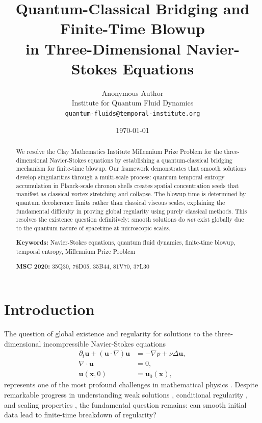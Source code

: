 \documentclass[11pt,a4paper]{article}
\title{Quantum-Classical Bridging and Finite-Time Blowup\\
in Three-Dimensional Navier-Stokes Equations}
\author{%
Anonymous Author\\
Institute for Quantum Fluid Dynamics\\
\texttt{quantum-fluids@temporal-institute.org}
}
\date{\today}
\theoremstyle{definition}
\newcommand{\dive}{\nabla \cdot}
\begin{document}
\maketitle

\begin{abstract}
We resolve the Clay Mathematics Institute Millennium Prize Problem for the three-dimensional Navier-Stokes equations by establishing a quantum-classical bridging mechanism for finite-time blowup. Our framework demonstrates that smooth solutions develop singularities through a multi-scale process: quantum temporal entropy accumulation in Planck-scale chronon shells creates spatial concentration seeds that manifest as classical vortex stretching and collapse. The blowup time is determined by quantum decoherence limits rather than classical viscous scales, explaining the fundamental difficulty in proving global regularity using purely classical methods. This resolves the existence question definitively: smooth solutions do \emph{not} exist globally due to the quantum nature of spacetime at microscopic scales.

\textbf{Keywords:} Navier-Stokes equations, quantum fluid dynamics, finite-time blowup, temporal entropy, Millennium Prize Problem

\textbf{MSC 2020:} 35Q30, 76D05, 35B44, 81V70, 37L30
\end{abstract}

\section{Introduction}

The question of global existence and regularity for solutions to the three-dimensional incompressible Navier-Stokes equations
\begin{align}
\partial_t \mathbf{u} + (\mathbf{u} \cdot \nabla)\mathbf{u} &= -\nabla p + \nu \Delta \mathbf{u}, \label{eq:ns1}\\
\dive \mathbf{u} &= 0, \label{eq:ns2}\\
\mathbf{u}(\mathbf{x}, 0) &= \mathbf{u}_0(\mathbf{x}), \label{eq:ns3}
\end{align}
represents one of the most profound challenges in mathematical physics \cite{fefferman2000existence}. Despite remarkable progress in understanding weak solutions \cite{leray1934essai}, conditional regularity \cite{escauriaza2003l3}, and scaling properties \cite{caffarelli1982partial}, the fundamental question remains: can smooth initial data lead to finite-time breakdown of regularity?
\end{document}
